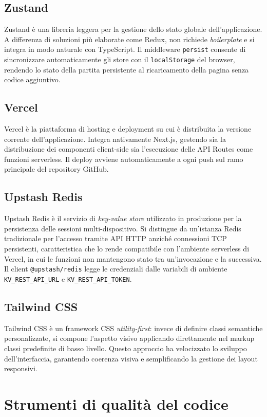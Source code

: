 \documentclass[12pt]{report}
\begin{document}
\subsection{Zustand}
Zustand è una libreria leggera per la gestione dello stato globale dell'applicazione.
A differenza di soluzioni più elaborate come Redux, non richiede \textit{boilerplate} e si integra in modo naturale con TypeScript.
Il middleware \texttt{persist} consente di sincronizzare automaticamente gli store con il \texttt{localStorage} del browser, rendendo lo stato della partita persistente al ricaricamento della pagina senza codice aggiuntivo.

\subsection{Vercel}
Vercel è la piattaforma di hosting e deployment su cui è distribuita la versione corrente dell'applicazione. Integra nativamente Next.js, gestendo sia la distribuzione dei componenti client-side sia l'esecuzione delle API Routes come funzioni serverless. Il deploy avviene automaticamente a ogni push sul ramo principale del repository GitHub.

\subsection{Upstash Redis}
Upstash Redis è il servizio di \textit{key-value store} utilizzato in produzione per la persistenza delle sessioni multi-dispositivo. Si distingue da un'istanza Redis tradizionale per l'accesso tramite API HTTP anziché connessioni TCP persistenti, caratteristica che lo rende compatibile con l'ambiente serverless di Vercel, in cui le funzioni non mantengono stato tra un'invocazione e la successiva. Il client \texttt{@upstash/redis} legge le credenziali dalle variabili di ambiente \texttt{KV\_REST\_API\_URL} e \texttt{KV\_REST\_API\_TOKEN}.

\subsection{Tailwind CSS}
Tailwind CSS è un framework CSS \textit{utility-first}: invece di definire classi semantiche personalizzate, si compone l'aspetto visivo applicando direttamente nel markup classi predefinite di basso livello.
Questo approccio ha velocizzato lo sviluppo dell'interfaccia, garantendo coerenza visiva e semplificando la gestione dei layout responsivi.

\section{Strumenti di qualità del codice}
\end{document}
